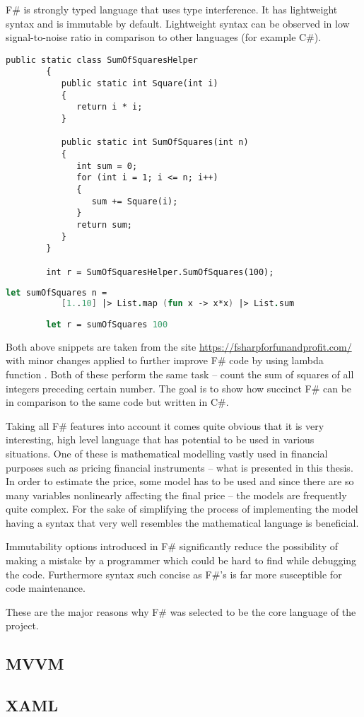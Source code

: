     F\# is strongly typed language that uses type interference. It has lightweight syntax and is immutable by default. Lightweight syntax can be observed in low signal-to-noise ratio in comparison to other languages (for example C\#).
    
    \begin{lstlisting}[caption=C\# code example]
        public static class SumOfSquaresHelper
        {
           public static int Square(int i)
           {
              return i * i;
           }
    
           public static int SumOfSquares(int n)
           {
              int sum = 0;
              for (int i = 1; i <= n; i++)
              {
                 sum += Square(i);
              }
              return sum;
           }
        }
        
        int r = SumOfSquaresHelper.SumOfSquares(100);
    \end{lstlisting}
    
    \begin{lstlisting}[language=FSharp, caption=F\# code example]
        let sumOfSquares n = 
           [1..10] |> List.map (fun x -> x*x) |> List.sum
        
        let r = sumOfSquares 100
    \end{lstlisting}
    
    Both above snippets are taken from the site \url{https://fsharpforfunandprofit.com/} with minor changes applied to further improve F\# code by using lambda function \cite{compareCandF}. Both of these perform the same task -- count the sum of squares of all integers preceding certain number. The goal is to show how succinct F\# can be in comparison to the same code but written in C\#.
    
    Taking all F\# features into account it comes quite obvious that it is very interesting, high level language that has potential to be used in various situations. One of these is mathematical modelling vastly used in financial purposes such as pricing financial instruments -- what is presented in this thesis. In order to estimate the price, some model has to be used and since there are so many variables nonlinearly affecting the final price -- the models are frequently quite complex. For the sake of simplifying the process of implementing the model having a syntax that very well resembles the mathematical language is beneficial.
    
    Immutability options introduced in F\# significantly reduce the possibility of making a mistake by a programmer which could be hard to find while debugging the code. Furthermore syntax such concise as F\#'s is far more susceptible for code maintenance.
    
    These are the major reasons why F\# was selected to be the core language of the project.
\subsection{MVVM}

\subsection{XAML}

